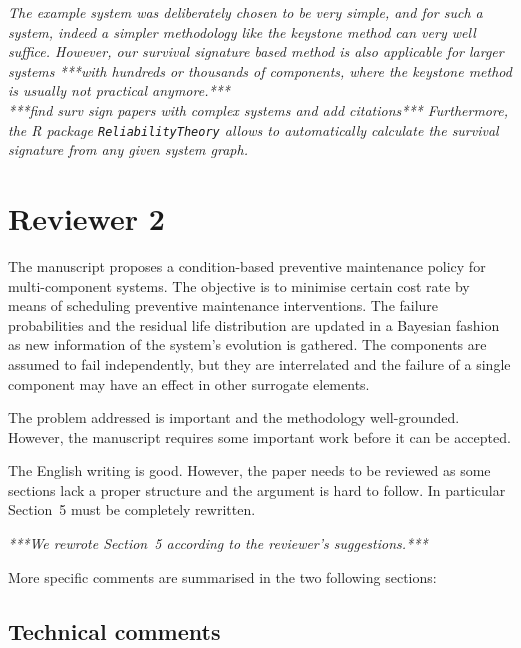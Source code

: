 \documentclass[authoryear]{elsarticle}
\begin{document}
\begin{enumerate}
\emph{The example system was deliberately chosen to be very simple,
and for such a system, indeed a simpler methodology like the keystone method can very well suffice.
However, our survival signature based method is also applicable for larger systems ***with hundreds or thousands of components,
where the keystone method is usually not practical anymore.***\\
***find surv sign papers with complex systems and add citations***
Furthermore, the \textsf{R} package \texttt{ReliabilityTheory} allows to automatically calculate the
survival signature from any given system graph.}
\end{enumerate}


\section*{Reviewer 2}

The manuscript proposes a condition-based preventive maintenance policy for multi-component systems. The objective is to minimise certain cost rate by means of scheduling preventive maintenance interventions. The failure probabilities and the residual life distribution are updated in a Bayesian fashion as new information of the system’s evolution is gathered. The components are assumed to fail independently, but they are interrelated and the failure of a single component may have an effect in other surrogate elements.

The problem addressed is important and the methodology well-grounded. However, the manuscript requires some important work before it can be accepted.

The English writing is good. However, the paper needs to be reviewed as some sections lack a proper structure and the argument is hard to follow. In particular Section~5 must be completely rewritten.

\smallskip

\emph{***We rewrote Section~5 according to the reviewer's suggestions.***}

\smallskip

More specific comments are summarised in the two following sections:

\subsection*{Technical comments}
\end{document}

